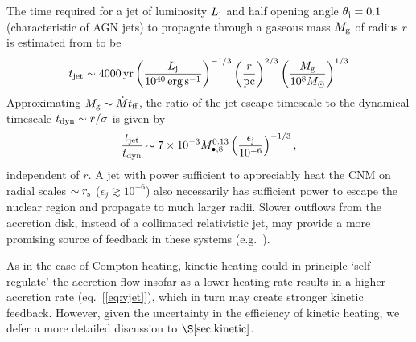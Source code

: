\documentclass[usenatbib,fleqn]{mn2e}
\begin{document}
The time required for a jet of luminosity $L_{\rm
  j}$ and half opening angle $\theta_{\rm j} = 0.1$ (characteristic of
AGN jets) to propagate through a gaseous mass $M_{\rm g}$ of radius $r$ is estimated from \citet{Bromberg+11} to be 
\begin{eqnarray}
t_{\rm jet} \sim 4000\,{\rm yr}\left(\frac{{L}_{\rm j}}{10^{40}\,\rm erg\,s^{-1}}\right)^{-1/3}\left(\frac{r}{\rm pc}\right)^{2/3}\left(\frac{M_{\rm g}}{10^{8}M_{\odot}}\right)^{1/3} 
\end{eqnarray}
Approximating $M_{\rm g} \sim \dot{M}t_{\rm ff}$, the ratio of the jet escape timescale to the dynamical timescale $t_{\rm dyn} \sim r/\sigma$ is given by
\begin{equation}
\frac{t_{\rm jet}}{t_{\rm dyn}} \sim 7\times 10^{-3}M_{\bullet,8}^{0.13}\left(\frac{\epsilon_{\rm j}}{10^{-6}}\right)^{-1/3},
\end{equation}
independent of $r$.  A jet with power sufficient to appreciably heat
the CNM on radial scales $\sim r_{\rm s}$ ($\epsilon_{j} \gtrsim
10^{-6}$) also necessarily has sufficient power to escape the nuclear
region and propagate to much larger radii.  Slower outflows from the
accretion disk, instead of a collimated relativistic jet, may provide
a more promising source of feedback in these systems
(e.g.~\citealt{Li+13}).

As in the case of Compton heating, kinetic heating could in principle
`self-regulate' the accretion flow insofar as a lower heating rate
results in a higher accretion rate (eq.~[\ref{eq:vjet}]), which in
turn may create stronger kinetic feedback.  However, given the uncertainty
in the efficiency of kinetic heating, we defer a more detailed discussion
to $\S\ref{sec:kinetic}$.
\end{document}
